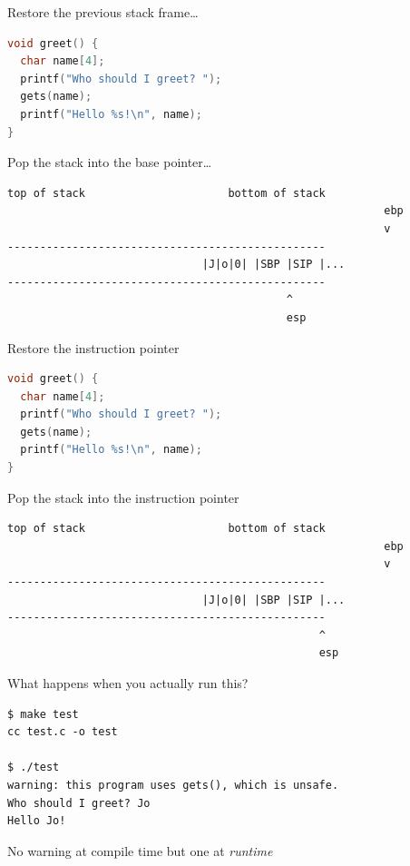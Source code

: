 \documentclass[9pt,aspectratio=169]{beamer}
\begin{document}
\begin{frame}[label={sec:org78a9c18},fragile]{Restore the previous stack frame\ldots{}}
 \begin{lstlisting}[language=C,numbers=none]
void greet() {
  char name[4];
  printf("Who should I greet? ");
  gets(name);
  printf("Hello %s!\n", name);
}
\end{lstlisting}

Pop the stack into the base pointer\ldots{}

\begin{verbatim}
top of stack                      bottom of stack
                                                          ebp
                                                          v
-------------------------------------------------
                              |J|o|0| |SBP |SIP |...
-------------------------------------------------
                                           ^
                                           esp
\end{verbatim}
\end{frame}
\begin{frame}[label={sec:org2154601},fragile]{Restore the instruction pointer}
 \begin{lstlisting}[language=C,numbers=none]
void greet() {
  char name[4];
  printf("Who should I greet? ");
  gets(name);
  printf("Hello %s!\n", name);
}
\end{lstlisting}

Pop the stack into the instruction pointer

\begin{verbatim}
top of stack                      bottom of stack
                                                          ebp
                                                          v
-------------------------------------------------
                              |J|o|0| |SBP |SIP |...
-------------------------------------------------
                                                ^
                                                esp
\end{verbatim}
\end{frame}
\begin{frame}[label={sec:orge619ece},fragile]{What happens when you actually run this?}
 \begin{lstlisting}[language=shell,numbers=none]
$ make test
cc test.c -o test

$ ./test
warning: this program uses gets(), which is unsafe.
Who should I greet? Jo
Hello Jo!
\end{lstlisting}

No warning at compile time but one at \emph{runtime}
\end{frame}
\end{document}
